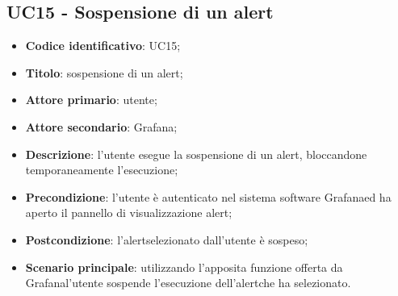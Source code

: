 \subsection{UC15 - Sospensione di un alert}
\begin{itemize}
	\item \textbf{Codice identificativo}: UC15;
	\item \textbf{Titolo}: sospensione di un alert\glo;
	\item \textbf{Attore primario}: utente;
	\item \textbf{Attore secondario}: Grafana\glo;
	\item \textbf{Descrizione}: l'utente esegue la sospensione di un alert\glosp, bloccandone temporaneamente l'esecuzione;
	\item \textbf{Precondizione}: l'utente è autenticato nel sistema software Grafana\glosp ed ha aperto il pannello di visualizzazione alert\glo;
	\item \textbf{Postcondizione}: l'alert\glosp selezionato dall'utente è sospeso;
	\item \textbf{Scenario principale}: utilizzando l'apposita funzione offerta da Grafana\glosp l'utente sospende l'esecuzione dell'alert\glosp che ha selezionato.
\end{itemize} 
